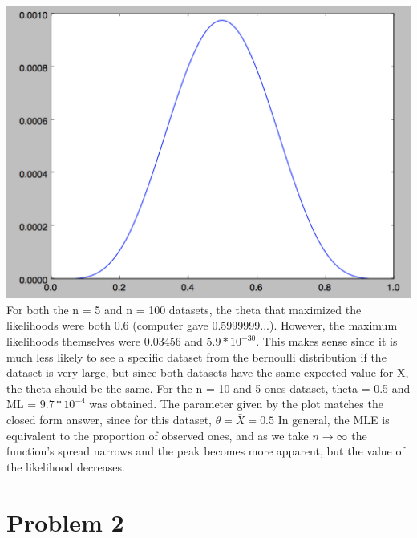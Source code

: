 \documentclass[11pt]{article}
\begin{document}
\begin{enumerate}
{\includegraphics[scale=0.5]{five.png} \newline{}
For both the n = 5 and n = 100 datasets, the theta that maximized the likelihoods were both 0.6 (computer gave 0.5999999...). However, the maximum likelihoods themselves were 0.03456 and $5.9 * 10^{-30}$. This makes sense since it is much less likely to see a specific dataset from the bernoulli distribution if the dataset is very large, but since both datasets have the same expected value for X, the theta should be the same. For the n = 10 and 5 ones dataset, theta = 0.5 and ML = $9.7 * 10^{-4}$ was obtained. The parameter given by the plot matches the closed form answer, since for this dataset, $\theta = \bar{X} = 0.5$ \newline{} In general, the MLE is equivalent to the proportion of observed ones, and as we take $ n \longrightarrow{} \infty $ the function's spread narrows and the peak becomes more apparent, but the value of the likelihood decreases.

}
\end{enumerate}

\newpage
\section{Problem 2}
\end{document}
